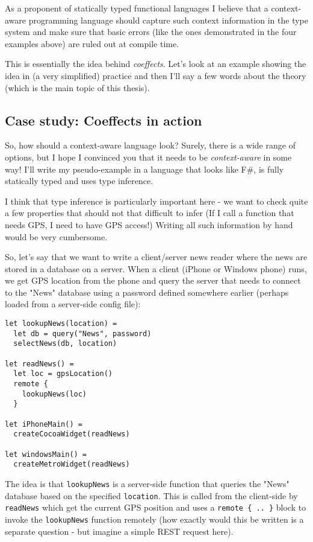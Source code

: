 As a proponent of statically typed functional languages I believe that a context-aware 
programming language should capture such context information in the type system and make
sure that basic errors (like the ones demonstrated in the four examples above) are ruled
out at compile time.  

This is essentially the idea behind \emph{coeffects}. Let's look at an example showing the
idea in (a very simplified) practice and then I'll say a few words about the theory
(which is the main topic of this thesis).


\subsection{Case study: Coeffects in action}

So, how should a context-aware language look? Surely, there is a wide range of options, but I hope
I convinced you that it needs to be \emph{context-aware} in some way! I'll write my pseudo-example in a
language that looks like F\#, is fully statically typed and uses type inference.

I think that type inference is particularly important here - we want to check quite a few properties
that should not that difficult to infer (If I call a function that needs GPS, I need to have GPS access!)
Writing all such information by hand would be very cumbersome.

So, let's say that we want to write a client/server news reader where the news are stored in a 
database on a server. When a client (iPhone or Windows phone) runs, we get GPS location from the
phone and query the server that needs to connect to the "News" database using a password defined
somewhere earlier (perhaps loaded from a server-side config file):

\begin{verbatim}
let lookupNews(location) =
  let db = query("News", password)
  selectNews(db, location)  

let readNews() =
  let loc = gpsLocation()       
  remote { 
    lookupNews(loc) 
  } 

let iPhoneMain() =
  createCocoaWidget(readNews)

let windowsMain() =    
  createMetroWidget(readNews)
\end{verbatim}

The idea is that \texttt{lookupNews} is a server-side function that queries the "News" database based on 
the specified \texttt{location}. This is called from the client-side by \texttt{readNews} which get the current GPS
position and uses a \texttt{remote \{ .. \}} block to invoke the \texttt{lookupNews} function remotely (how exactly would
this be written is a separate question - but imagine a simple REST request here).

